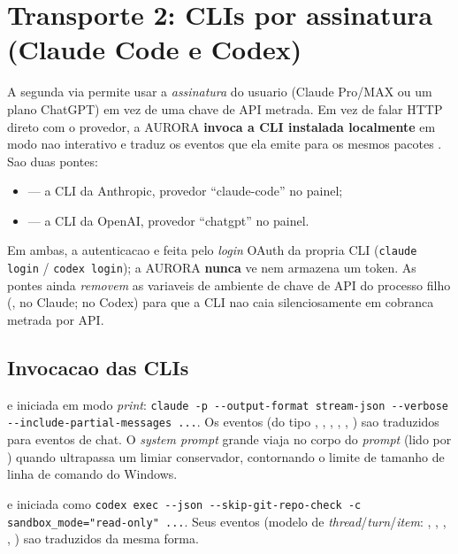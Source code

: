 \section{Transporte 2: CLIs por assinatura (Claude Code e Codex)}

A segunda via permite usar a \emph{assinatura} do usuario (Claude Pro/MAX ou um
plano ChatGPT) em vez de uma chave de API metrada. Em vez de falar HTTP direto
com o provedor, a AURORA \textbf{invoca a CLI instalada localmente} em modo
nao interativo e traduz os eventos que ela emite para os mesmos pacotes
. Sao duas pontes:

\begin{itemize}[leftmargin=1.4em]
  \item {} --- a CLI  da Anthropic, provedor \enquote{claude-code} no painel;
  \item {} --- a CLI  da OpenAI, provedor \enquote{chatgpt} no painel.
\end{itemize}

Em ambas, a autenticacao e feita pelo \emph{login} OAuth da propria CLI
(\lstinline|claude login| / \lstinline|codex login|); a AURORA \textbf{nunca} ve
nem armazena um token. As pontes ainda \emph{removem} as variaveis de ambiente
de chave de API do processo filho (,
 no Claude;  no Codex) para
que a CLI nao caia silenciosamente em cobranca metrada por API.

\subsection{Invocacao das CLIs}

\begin{description}[leftmargin=0pt, style=nextline]
  \item[Claude Code] e iniciada em modo \emph{print}: \lstinline|claude -p --output-format stream-json --verbose --include-partial-messages ...|. Os eventos  (do tipo , , , , , ) sao traduzidos para eventos de chat. O \emph{system prompt} grande viaja no corpo do \emph{prompt} (lido por ) quando ultrapassa um limiar conservador, contornando o limite de tamanho de linha de comando do Windows.
  \item[Codex] e iniciada como \lstinline|codex exec --json --skip-git-repo-check -c sandbox_mode="read-only" ...|. Seus eventos (modelo de \emph{thread}/\emph{turn}/\emph{item}: , , , , ) sao traduzidos da mesma forma.
\end{description}

